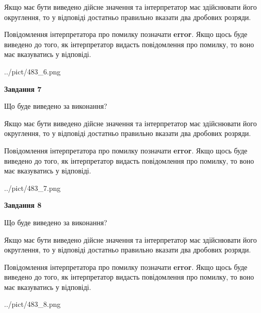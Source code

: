\documentclass[12pt, ukrainian]{article}
\begin{document}
{\begin {Large}
Якщо має бути виведено дійсне значення та інтерпретатор має здійснювати його округлення, 
то у відповіді достатньо правильно вказати два дробових розряди.

Повідомлення інтерпретатора про помилку позначати \textbf{error}.
Якщо щось буде виведено до того, як інтерпретатор видасть повідомлення про помилку, 
то воно має вказуватись у відповіді. \par

\begin{center}
	{../pict/483_6.png}
\end{center}
\newpage

{\begin {center}\textbf{Завдання 7}\end {center}}\par
Що буде виведено за виконання? \par

Якщо має бути виведено дійсне значення та інтерпретатор має здійснювати його округлення, 
то у відповіді достатньо правильно вказати два дробових розряди.

Повідомлення інтерпретатора про помилку позначати \textbf{error}.
Якщо щось буде виведено до того, як інтерпретатор видасть повідомлення про помилку, 
то воно має вказуватись у відповіді. \par

\begin{center}
	{../pict/483_7.png}
\end{center}
\newpage

{\begin {center}\textbf{Завдання 8}\end {center}}\par
Що буде виведено за виконання? \par

Якщо має бути виведено дійсне значення та інтерпретатор має здійснювати його округлення, 
то у відповіді достатньо правильно вказати два дробових розряди.

Повідомлення інтерпретатора про помилку позначати \textbf{error}.
Якщо щось буде виведено до того, як інтерпретатор видасть повідомлення про помилку, 
то воно має вказуватись у відповіді. \par

\begin{center}
	{../pict/483_8.png}
\end{center}
\newpage


\end{Large}}
\end{document}
